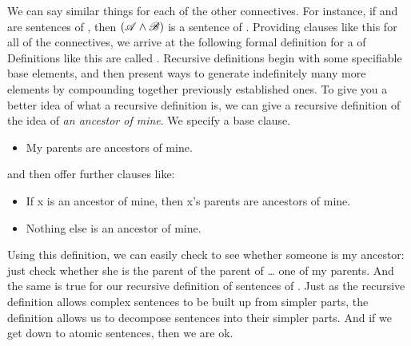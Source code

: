 We can say similar things for each of the other connectives. For instance, if  and  are sentences of \TFL, then $(\mathscr{A}\wedge\mathscr{B})$ is a sentence of \TFL. Providing clauses like this for all of the connectives, we arrive at the following formal definition for a  of \TFL\:
Definitions like this are called . Recursive definitions begin with some specifiable base elements, and then present ways to generate indefinitely many more elements by compounding together previously established ones. To give you a better idea of what a recursive definition is, we can give a recursive definition of the idea of \emph{an ancestor of mine}. We specify a base clause.
	\begin{itemize}
		\item My parents are ancestors of mine.
	\end{itemize}
and then offer further clauses like:
	\begin{itemize}
		\item If x is an ancestor of mine, then x's parents are ancestors of mine.
		\item Nothing else is an ancestor of mine.
	\end{itemize}
Using this definition, we can easily check to see whether someone is my ancestor: just check whether she is the parent of the parent of … one of my parents. And the same is true for our recursive definition of sentences of \TFL. Just as the recursive definition allows complex sentences to be built up from simpler parts, the definition allows us to decompose sentences into their simpler parts. And if we get down to atomic sentences, then we are ok. 

